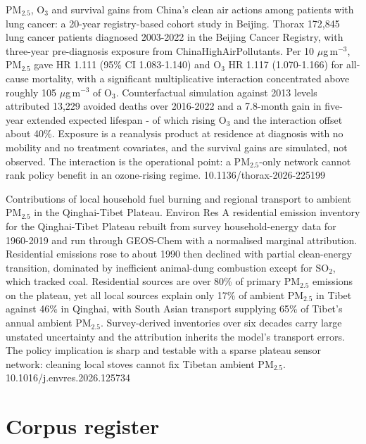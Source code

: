 \documentclass[10pt]{article}
\begin{document}
{PM$_{2.5}$, O$_3$ and survival gains from China's clean air actions among patients with lung cancer: a 20-year registry-based cohort study in Beijing.}
{Thorax}
{172,845 lung cancer patients diagnosed 2003-2022 in the Beijing Cancer Registry, with three-year pre-diagnosis exposure from ChinaHighAirPollutants. Per 10 $\mu$g\,m$^{-3}$, PM$_{2.5}$ gave HR 1.111 (95\% CI 1.083-1.140) and O$_3$ HR 1.117 (1.070-1.166) for all-cause mortality, with a significant multiplicative interaction concentrated above roughly 105 $\mu$g\,m$^{-3}$ of O$_3$. Counterfactual simulation against 2013 levels attributed 13,229 avoided deaths over 2016-2022 and a 7.8-month gain in five-year extended expected lifespan - of which rising O$_3$ and the interaction offset about 40\%. Exposure is a reanalysis product at residence at diagnosis with no mobility and no treatment covariates, and the survival gains are simulated, not observed. The interaction is the operational point: a PM$_{2.5}$-only network cannot rank policy benefit in an ozone-rising regime.}
{10.1136/thorax-2026-225199}

{Contributions of local household fuel burning and regional transport to ambient PM$_{2.5}$ in the Qinghai-Tibet Plateau.}
{Environ Res}
{A residential emission inventory for the Qinghai-Tibet Plateau rebuilt from survey household-energy data for 1960-2019 and run through GEOS-Chem with a normalised marginal attribution. Residential emissions rose to about 1990 then declined with partial clean-energy transition, dominated by inefficient animal-dung combustion except for SO$_2$, which tracked coal. Residential sources are over 80\% of primary PM$_{2.5}$ emissions on the plateau, yet all local sources explain only 17\% of ambient PM$_{2.5}$ in Tibet against 46\% in Qinghai, with South Asian transport supplying 65\% of Tibet's annual ambient PM$_{2.5}$. Survey-derived inventories over six decades carry large unstated uncertainty and the attribution inherits the model's transport errors. The policy implication is sharp and testable with a sparse plateau sensor network: cleaning local stoves cannot fix Tibetan ambient PM$_{2.5}$.}
{10.1016/j.envres.2026.125734}

\vspace{4mm}

\section*{\sffamily\bfseries\color{Deep}Corpus register}
\vspace{-1.5mm}{\color{Amber}\rule{\linewidth}{1.1pt}}\vspace{2.5mm}
\end{document}
